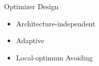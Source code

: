 \documentclass[final]{beamer}
\begin{document}
{\begin{frame}{}
\begin{center}
\begin{columns}[t]
\begin{column}{0.32\textwidth}
 
    \begin{block}{\huge Optimizer Design}
\vspace{.5cm}

\begin{itemize}
\item Architecture-independent

\item Adaptive

\item Local-optimum Avoiding
\end{itemize}

\begin{center}
\begin{figure}
\end{figure}
\end{center}


\end{block}

\vspace{1.5cm}


\end{column}
\end{columns}
\end{center}
\end{frame}}
\end{document}

